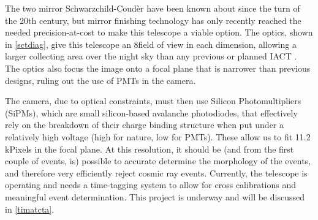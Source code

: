 The two mirror Schwarzchild-Coud\`{e}r have been known about since the turn of the 20th century, but mirror finishing technology has only recently reached the needed precision-at-cost to make this telescope a viable option. The optics, shown in \autoref{sctdiag}, give this telescope an 8\degree field of view in each dimension, allowing a larger collecting area over the night sky than any previous or planned IACT \cite{psctoptics}. The optics also focus the image onto a focal plane that is narrower than previous designs, ruling out the use of PMTs in the camera.

The camera, due to optical constraints, must then use Silicon Photomultipliers (SiPMs), which are small silicon-based avalanche photodiodes, that effectively rely on the breakdown of their charge binding structure when put under a relatively high voltage (high for nature, low for PMTs). These allow us to fit 11.2 kPixels in the focal plane. At this resolution, it should be (and from the first couple of events, is) possible to accurate determine the morphology of the events, and therefore very efficiently reject cosmic ray events. Currently, the telescope is operating and needs a time-tagging system to allow for cross calibrations and meaningful event determination. This project is underway and will be discussed in \autoref{timatcta}.




